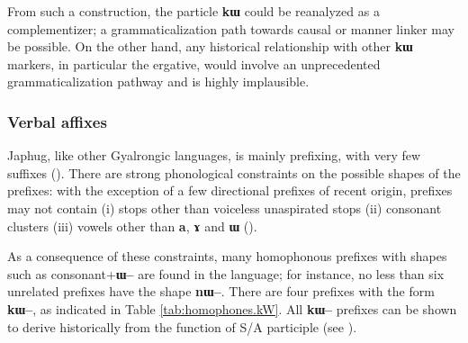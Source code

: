\documentclass[oldfontcommands,oneside,a4paper,11pt]{article}
\newcommand{\ipa}[1]{{\phon\textbf{#1}}}
\begin{document}
 From such a construction, the particle \ipa{kɯ} could be reanalyzed as a complementizer; a grammaticalization path towards causal or manner linker may be possible. On the other hand, any historical relationship with other \ipa{kɯ} markers, in particular the ergative, would involve an unprecedented grammaticalization pathway and is highly implausible.
    
\subsubsection{Verbal affixes}
Japhug, like other Gyalrongic languages, is mainly prefixing, with very few suffixes (\citealt{jacques13harmonization}).  There are strong phonological constraints on the possible shapes of the prefixes: with the exception of a few directional prefixes of recent origin, prefixes may not contain (i)  stops other than voiceless unaspirated stops (ii) consonant clusters (iii) vowels other than \ipa{a}, \ipa{ɤ} and \ipa{ɯ}  (\citealt{jacques14antipassive}).  

 As a consequence of these constraints, many homophonous prefixes with shapes such as consonant+\ipa{ɯ--}  are found in the language; for instance, no less than six  unrelated prefixes have the shape \ipa{nɯ--}. There are four prefixes with the form \ipa{kɯ--}, as indicated in Table \ref{tab:homophones.kW}.  All \ipa{kɯ--} prefixes can be shown to derive historically from the function of S/A participle (see \citealt{jacques15generic}).  
\end{document}
